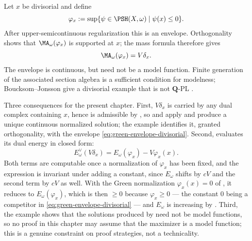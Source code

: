 \begin{example}
\label{ex:ch28-divisorial-green}
Let $x$ be divisorial and define
\begin{equation}
\label{eq:green-envelope-divisorial}
 \varphi_x:=\sup\{\psi\in\PSH(X,\omega)\mid\psi(x)\leq0\}.
\end{equation}
After upper-semicontinuous regularization this is an envelope.  Orthogonality
shows that $\MA_\omega(\varphi_x)$ is supported at $x$; the mass formula
therefore gives
\[
                      \MA_\omega(\varphi_x)=V\delta_x.
\]
The envelope is continuous, but need not be a model function.  Finite
generation of the associated section algebra is a sufficient condition for
modelness; Boucksom--Jonsson give a divisorial example that is not
$\mathbf Q$-PL \cite[Theorem~A]{BJGreen24}.

Three consequences for the present chapter.  First, $V\delta_x$ is carried
by any dual complex containing $x$, hence is admissible by
, so
 and
 apply and produce a unique continuous normalized
solution; the example identifies it, granted orthogonality, with the
envelope \eqref{eq:green-envelope-divisorial}.  Second,
 evaluates its dual energy in closed form:
\[
 E^\vee_\omega(V\delta_x)=E_\omega(\varphi_x)-V\varphi_x(x).
\]
Both terms are computable once a normalization of $\varphi_x$ has been
fixed, and the expression is invariant under adding a constant, since
$E_\omega$ shifts by $cV$ and the second term by $cV$ as well.  With
the Green normalization $\varphi_x(x)=0$ of \cite{BJGreen24}, it reduces to
$E_\omega(\varphi_x)$, which is then $\geq0$ because $\varphi_x\geq0$
--- the constant $0$ being a competitor in
\eqref{eq:green-envelope-divisorial} --- and $E_\omega$ is increasing by
.  Third, the example shows that the
solutions produced by  need not be model
functions, so no proof in this chapter may assume that the maximizer is a
model function; this is a genuine constraint on proof strategies, not a
technicality.
\end{example}

